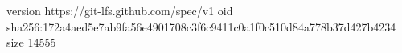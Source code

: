 version https://git-lfs.github.com/spec/v1
oid sha256:172a4aed5e7ab9fa56e4901708c3f6c9411c0a1f0c510d84a778b37d427b4234
size 14555
